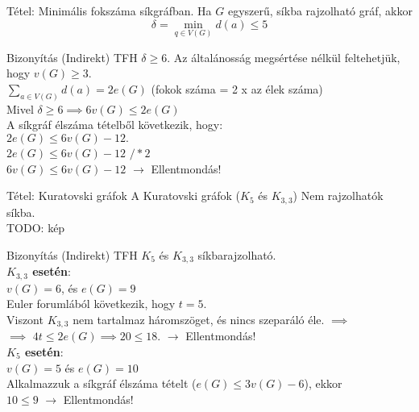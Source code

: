 \documentclass{beamer}
\begin{document}
\begin{frame}
\begin{block}{Tétel: Minimális fokszáma síkgráfban.}
Ha $G$ egyszerű, síkba rajzolható gráf, akkor $$\delta = \min_{{q \in V(G)}} d(a) \leq 5$$

\end{block}

\begin{block}{Bizonyítás (Indirekt)}
TFH $\delta \geq 6$.
Az általánosság megsértése nélkül feltehetjük, hogy $v(G) \geq 3$.\\
$\sum_{{a \in V(G)}} d(a) = 2e(G)$ (fokok száma = 2 x az élek száma)\\
Mivel $\delta \geq 6 \implies 6v(G) \leq 2e(G)$\\
A síkgráf élszáma tételből következik, hogy:\\
$2e(G) \leq 6v(G) - 12.$\\
\bigskip
$2e(G) \leq 6v(G) - 12$ \hspace{1ex} $/*2$\\
$6v(G) \leq 6v(G) - 12$ $\rightarrow$ Ellentmondás!

\end{block}

\end{frame}

\begin{frame}
\begin{block}{Tétel: Kuratovski gráfok}
A Kuratovski gráfok ($K_5$ és $K_{3,3}$) Nem rajzolhatók síkba.\\
TODO: kép

\end{block}

\begin{block}{Bizonyítás (Indirekt)}
TFH $K_5$ és $K_{3,3}$ síkbarajzolható.\\
\smallskip
\textbf{$K_{3,3}$ esetén}:\\
$v(G) = 6$, és $e(G) = 9$\\
Euler forumlából következik, hogy $t = 5$.\\
Viszont $K_{3,3}$ nem tartalmaz háromszöget, és nincs szeparáló éle. $\implies$\\
$\implies$ $4t \leq 2e(G) \implies 20 \leq 18$. $\rightarrow$ Ellentmondás!\\
\smallskip
\textbf{$K_5$ esetén}:\\
$v(G) = 5$ és $e(G) = 10$\\
Alkalmazzuk a síkgráf élszáma tételt ($e(G) \leq 3v(G) - 6$), ekkor\\
$10 \leq 9$ $\rightarrow$ Ellentmondás!

\end{block}

\end{frame}
\end{document}
